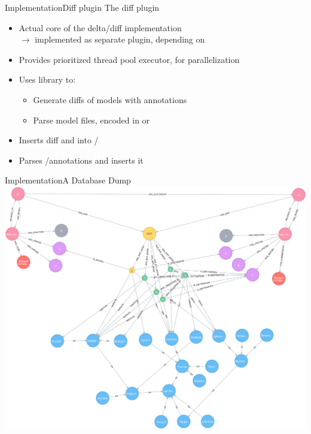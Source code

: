 \begin{frame}{Implementation}{Diff plugin}
	{\Large The diff plugin}
	\\[1.5em]
	\begin{itemize}
		\item Actual core of the delta/diff implementation\\
			$\rightarrow$ implemented as separate plugin, depending on \masymos
		\item Provides prioritized thread pool executor, for parallelization 
		\item Uses \bives library \citep{Scharm2015} to:
		\begin{itemize}
			\item Generate diffs of models with \comodi \citep{Scharm2016} annotations
			\item Parse model files, encoded in \sbml or \cellml
		\end{itemize}
		\item Inserts diff and  into \neoj/\masymos
		\item Parses \xml/\rdf \comodi annotations and inserts it
	\end{itemize}
\end{frame}

\begin{frame}{Implementation}{A Database Dump}
	\centering
	\includegraphics[width=\linewidth,height=\textheight,keepaspectratio]{../tex/resources/neo4j-renders/demo-sbml-simple-diff.pdf}
\end{frame}

